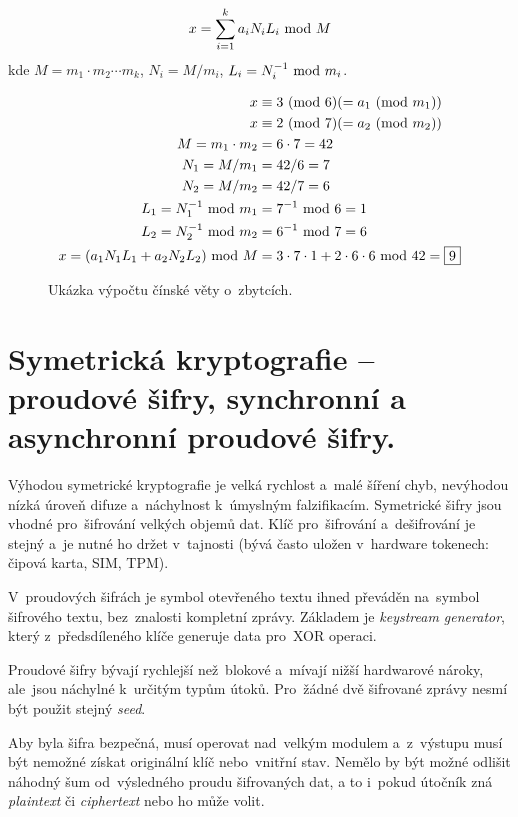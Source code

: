 $$ x = \sum_{i=1}^{k} a_i N_i L_i \ \mathrm{mod}\ M $$
kde $M = m_1 \cdot m_2 \cdots m_k$, $N_i = M / m_i$, $L_i = N_i^{-1} \ \mathrm{mod}\ m_i$.

\begin{figure}[ht]
\centering
\begin{align*}
x &\equiv 3 \ (\mathrm{mod}\ 6) (= a_1 \ (\mathrm{mod}\ m_1)) \\
x &\equiv 2 \ (\mathrm{mod}\ 7) (= a_2 \ (\mathrm{mod}\ m_2)) \\
M = m_1 \cdot m_2 &= 6 \cdot 7 = 42 \\
N_1 = M / m_1 &= 42 / 6 = 7 \\
N_2 = M / m_2 &= 42 / 7 = 6 \\
L_1 = N_1^{-1} \ \mathrm{mod}\ m_1 &= 7^{-1} \ \mathrm{mod}\ 6 = 1 \\
L_2 = N_2^{-1} \ \mathrm{mod}\ m_2 &= 6^{-1} \ \mathrm{mod}\ 7 = 6 \\
x = (a_1 N_1 L_1 + a_2 N_2 L_2) \ \mathrm{mod}\ M &= 3 \cdot 7 \cdot 1 + 2 \cdot 6 \cdot 6 \ \mathrm{mod}\ 42 = \boxed{9} \\
\end{align*}
\vspace*{-4em}
\caption*{Ukázka výpočtu čínské věty o~zbytcích.}
\end{figure}

\clearpage
\section{Symetrická kryptografie -- proudové šifry, synchronní a asynchronní proudové šifry.}
\label{question-4}

Výhodou symetrické kryptografie je velká rychlost a~malé šíření chyb, nevýhodou nízká úroveň difuze a~náchylnost k~úmyslným falzifikacím. Symetrické šifry jsou vhodné pro~šifrování velkých objemů dat. Klíč pro~šifrování a~dešifrování je stejný a~je nutné ho držet v~tajnosti (bývá často uložen v~hardware tokenech: čipová karta, SIM, TPM).

V~proudových šifrách je symbol otevřeného textu ihned převáděn na~symbol šifrového textu, bez~znalosti kompletní zprávy. Základem je \emph{keystream generator}, který z~předsdíleného klíče generuje data pro~XOR operaci.

Proudové šifry bývají rychlejší než~blokové a~mívají nižší hardwarové nároky, ale~jsou náchylné k~určitým typům útoků. Pro~žádné dvě šifrované zprávy nesmí být použit stejný \emph{seed}.

Aby byla šifra bezpečná, musí operovat nad~velkým modulem a~z~výstupu musí být nemožné získat originální klíč nebo~vnitřní stav. Nemělo by být možné odlišit náhodný šum od~výsledného proudu šifrovaných dat, a to i~pokud útočník zná \emph{plaintext} či \emph{ciphertext} nebo ho může volit.


